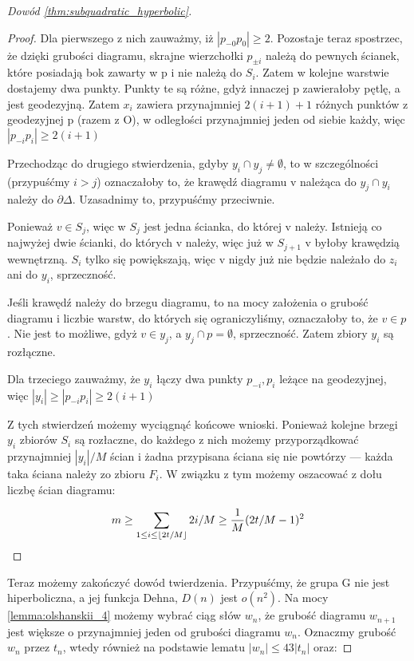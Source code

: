 \documentclass[licencjacka]{pracamgr}
\DeclarePairedDelimiter\floor{\lfloor}{\rfloor}
\begin{document}
\begin{proof}[Dowód \ref{thm:subquadratic_hyperbolic}]
\begin{proof}
Dla pierwszego z nich zauważmy, iż $|p_{-0}p_{0}| \geq 2$. Pozostaje teraz spostrzec, że dzięki grubości diagramu, skrajne wierzchołki $p_{\pm i}$ należą do pewnych ścianek, które posiadają bok zawarty w p i nie należą do $S_i$. Zatem w kolejne warstwie dostajemy dwa punkty. Punkty te są różne, gdyż innaczej p zawierałoby pętlę, a jest geodezyjną. Zatem $x_i$ zawiera przynajmniej $2(i + 1) + 1$ różnych punktów z geodezyjnej p (razem z O), w odległości przynajmniej jeden od siebie każdy, więc $|p_{-i}p_{i}| \geq 2(i + 1)$

Przechodząc do drugiego stwierdzenia, gdyby $y_{i} \cap y_{j} \neq \emptyset$, to w szczególności (przypuśćmy $i > j$) oznaczałoby to, że krawędź diagramu v należąca do $y_j \cap y_{i}$ należy do $\partial \Delta$. Uzasadnimy to, przypuśćmy przeciwnie.

Ponieważ $v \in S_j$, więc w $S_j$ jest jedna ścianka, do której v należy. Istnieją co najwyżej dwie ścianki, do których v należy, więc już w $S_{j+1}$ v byłoby krawędzią wewnętrzną. $S_i$ tylko się powiększają, więc v nigdy już nie będzie należało do $z_i$ ani do $y_i$, sprzeczność.

Jeśli krawędź należy do brzegu diagramu, to na mocy założenia o grubość diagramu i liczbie warstw, do których się ograniczyliśmy, oznaczałoby to, że $v \in p$. Nie jest to możliwe, gdyż $v \in y_j$, a $y_j \cap p = \emptyset$, sprzeczność. Zatem zbiory $y_i$ są rozłączne.

Dla trzeciego zauważmy, że $y_i$ łączy dwa punkty $p_{-i}, p_{i}$ leżące na geodezyjnej, więc $|y_{i}| \geq |p_{-i}p_{i}| \geq 2(i + 1)$

Z tych stwierdzeń możemy wyciągnąć końcowe wnioski. Ponieważ kolejne brzegi $y_{i}$ zbiorów $S_{i}$ są rozłaczne, do każdego z nich możemy przyporządkować przynajmniej $|y_{i}| / M$ ścian i żadna przypisana ściana się nie powtórzy — każda taka ściana należy zo zbioru $F_{i}$. W związku z tym możemy oszacować z dołu liczbę ścian diagramu:

\[ m \geq \sum_{1 \leq i \leq \floor{2t/M}} 2i/M \geq \frac{1}{M} (2t/M - 1) ^2 \]

\end{proof}

Teraz możemy zakończyć dowód twierdzenia. Przypuśćmy, że grupa G nie jest hiperboliczna, a jej funkcja Dehna, $D(n)$ jest $o(n^2)$. Na mocy \ref{lemma:olshanskii_4} możemy wybrać ciąg słów $w_n$, że grubość diagramu $w_{n+1}$ jest większe o przynajmniej jeden od grubości diagramu $w_{n}$. Oznaczmy grubość $w_n$ przez $t_n$, wtedy również na podstawie lematu $|w_n| \leq 43|t_n|$ oraz:


\end{proof}
\end{document}

